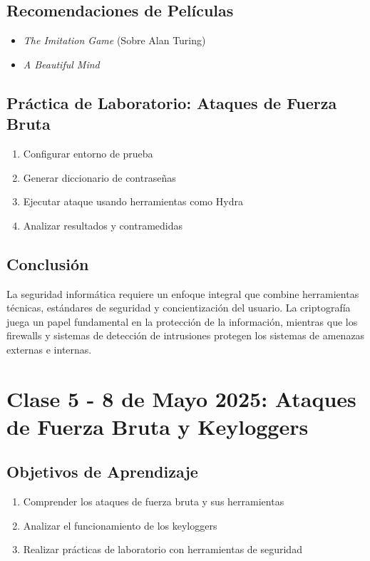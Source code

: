 \documentclass[12pt,a4paper]{article}
\begin{document}
\subsection{Recomendaciones de Películas}
\begin{itemize}
    \item \textit{The Imitation Game} (Sobre Alan Turing)
    \item \textit{A Beautiful Mind}
\end{itemize}

\subsection{Práctica de Laboratorio: Ataques de Fuerza Bruta}
\begin{enumerate}
    \item Configurar entorno de prueba
    \item Generar diccionario de contraseñas
    \item Ejecutar ataque usando herramientas como Hydra
    \item Analizar resultados y contramedidas
\end{enumerate}

\subsection{Conclusión}
La seguridad informática requiere un enfoque integral que combine herramientas técnicas, estándares de seguridad y concientización del usuario. La criptografía juega un papel fundamental en la protección de la información, mientras que los firewalls y sistemas de detección de intrusiones protegen los sistemas de amenazas externas e internas.


\section{Clase 5 - 8 de Mayo 2025: Ataques de Fuerza Bruta y Keyloggers}
\subsection{Objetivos de Aprendizaje}
\begin{enumerate}
    \item Comprender los ataques de fuerza bruta y sus herramientas
    \item Analizar el funcionamiento de los keyloggers
    \item Realizar prácticas de laboratorio con herramientas de seguridad
\end{enumerate}
\end{document}
